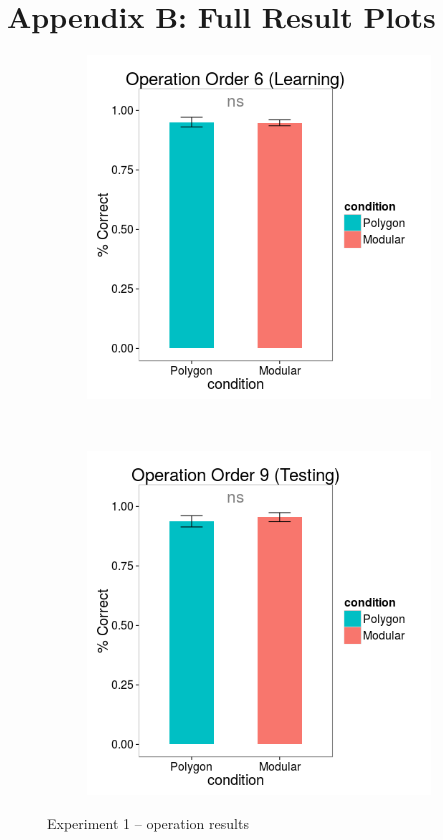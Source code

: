 \documentclass[man,10pt]{apa6}
\begin{document}
\section{Appendix B: Full Result Plots}
\begin{figure}[H]
\centering
\begin{subfigure}[c]{0.3\textwidth}
\centering
\includegraphics[width=\textwidth]{figures/1/op_6_r.png}
\end{subfigure}
~
\begin{subfigure}[c]{0.3\textwidth}
\centering
\includegraphics[width=\textwidth]{figures/1/op_9_r.png}
\end{subfigure}
\caption{Experiment 1 -- operation results}
\label{ex1_op}
\end{figure} 
\end{document}
